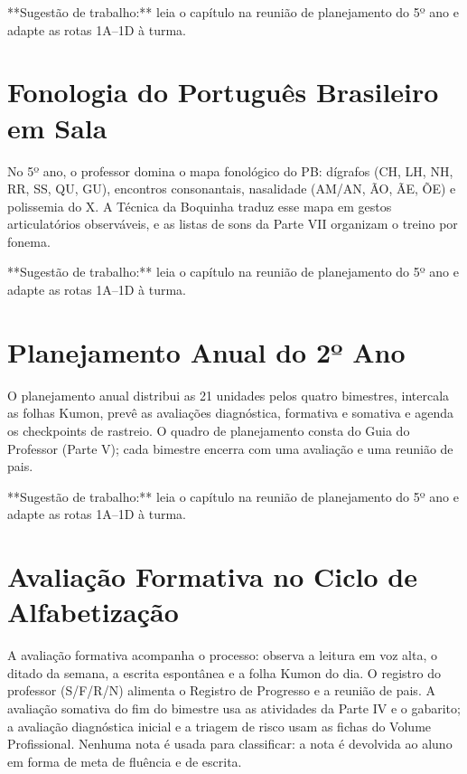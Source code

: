 \begin{dica}
**Sugestão de trabalho:** leia o capítulo na reunião de planejamento do 5º ano e adapte as rotas 1A–1D à turma.
\end{dica}

\chapter{Fonologia do Português Brasileiro em Sala}

No 5º ano, o professor domina o mapa fonológico do PB: dígrafos (CH, LH, NH, RR, SS, QU, GU), encontros consonantais, nasalidade (AM/AN, ÃO, ÃE, ÕE) e polissemia do X. A Técnica da Boquinha traduz esse mapa em gestos articulatórios observáveis, e as listas de sons da Parte VII organizam o treino por fonema.


\begin{dica}
**Sugestão de trabalho:** leia o capítulo na reunião de planejamento do 5º ano e adapte as rotas 1A–1D à turma.
\end{dica}

\chapter{Planejamento Anual do 2º Ano}

O planejamento anual distribui as 21 unidades pelos quatro bimestres, intercala as folhas Kumon, prevê as avaliações diagnóstica, formativa e somativa e agenda os checkpoints de rastreio. O quadro de planejamento consta do Guia do Professor (Parte V); cada bimestre encerra com uma avaliação e uma reunião de pais.


\begin{dica}
**Sugestão de trabalho:** leia o capítulo na reunião de planejamento do 5º ano e adapte as rotas 1A–1D à turma.
\end{dica}

\chapter{Avaliação Formativa no Ciclo de Alfabetização}

A avaliação formativa acompanha o processo: observa a leitura em voz alta, o ditado da semana, a escrita espontânea e a folha Kumon do dia. O registro do professor (S/F/R/N) alimenta o Registro de Progresso e a reunião de pais. A avaliação somativa do fim do bimestre usa as atividades da Parte IV e o gabarito; a avaliação diagnóstica inicial e a triagem de risco usam as fichas do Volume Profissional. Nenhuma nota é usada para classificar: a nota é devolvida ao aluno em forma de meta de fluência e de escrita.


